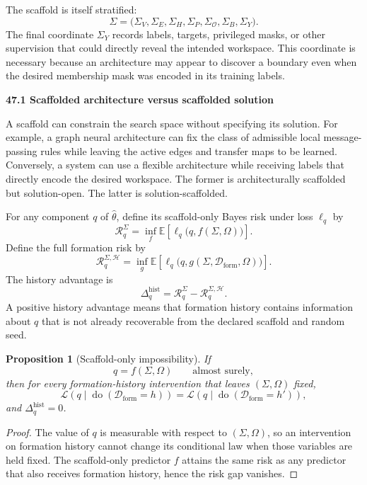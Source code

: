 \documentclass[11pt,letterpaper]{article}
\newcommand{\subtopic}[1]{%
 \vspace{0.45em}
 {\bfseries\color{AccentColor} #1\par}
}
\theoremstyle{plain}
\newtheorem{proposition}[theorem]{Proposition}
\theoremstyle{definition}
\begin{document}
The scaffold is itself stratified:
\[
\boxed{
\Sigma
=
\bigl(
\Sigma_V,
\Sigma_E,
\Sigma_H,
\Sigma_P,
\Sigma_{\mathcal O},
\Sigma_B,
\Sigma_Y
\bigr).
}
\]
The final coordinate \(\Sigma_Y\) records labels, targets, privileged masks,
or other supervision that could directly reveal the intended workspace. This
coordinate is necessary because an architecture may appear to discover a
boundary even when the desired membership mask was encoded in its training
labels.

\subtopic{47.1 Scaffolded architecture versus scaffolded solution}

A scaffold can constrain the search space without specifying its solution.
For example, a graph neural architecture can fix the class of admissible local
message-passing rules while leaving the active edges and transfer maps to be
learned. Conversely, a system can use a flexible architecture while receiving
labels that directly encode the desired workspace. The former is
architecturally scaffolded but solution-open. The latter is solution-scaffolded.

For any component \(q\) of \(\widehat\theta\), define its scaffold-only Bayes
risk under loss \(\ell_q\) by
\[
\mathcal R_q^{\Sigma}
=
\inf_f
\mathbb E
\left[
\ell_q\bigl(q,f(\Sigma,\Omega)\bigr)
\right].
\]
Define the full formation risk by
\[
\mathcal R_q^{\Sigma,\mathcal H}
=
\inf_g
\mathbb E
\left[
\ell_q\bigl(q,g(\Sigma,\mathcal D_{\mathrm{form}},\Omega)\bigr)
\right].
\]
The history advantage is
\[
\boxed{
\Delta_q^{\mathrm{hist}}
=
\mathcal R_q^{\Sigma}
-
\mathcal R_q^{\Sigma,\mathcal H}.
}
\]
A positive history advantage means that formation history contains information
about \(q\) that is not already recoverable from the declared scaffold and
random seed.

\begin{proposition}[Scaffold-only impossibility]\label{prop:scaffold-only-impossibility}
If
\[
q=f(\Sigma,\Omega)
\qquad\text{almost surely},
\]
then for every formation-history intervention that leaves \((\Sigma,\Omega)\)
fixed,
\[
\mathcal L\!\left(q\mid
\operatorname{do}(\mathcal D_{\mathrm{form}}=h)
\right)
=
\mathcal L\!\left(q\mid
\operatorname{do}(\mathcal D_{\mathrm{form}}=h')
\right),
\]
and \(\Delta_q^{\mathrm{hist}}=0\).
\end{proposition}

\begin{proof}
The value of \(q\) is measurable with respect to \((\Sigma,\Omega)\), so an
intervention on formation history cannot change its conditional law when those
variables are held fixed. The scaffold-only predictor \(f\) attains the same
risk as any predictor that also receives formation history, hence the risk gap
vanishes.
\end{proof}
\end{document}
